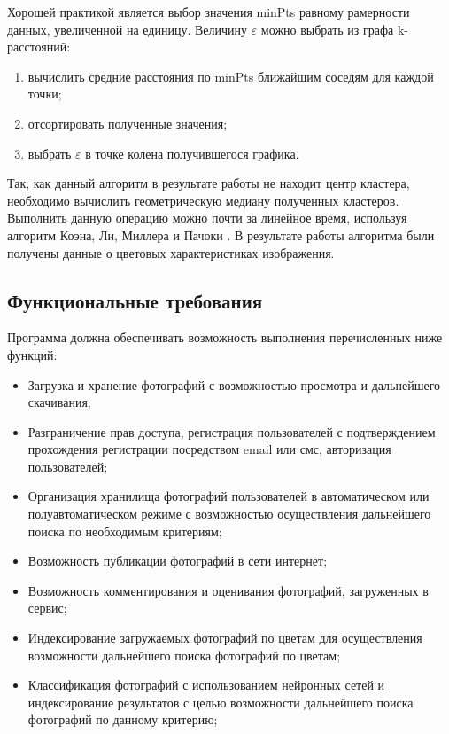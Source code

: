 Хорошей практикой является выбор значения minPts равному рамерности данных, увеличенной на единицу.
Величину \(\mathcal{\varepsilon}\) можно выбрать из графа k-расстояний\cite{k-graph}:
\begin{enumerate}
    \item вычислить средние расстояния по minPts ближайшим соседям для каждой точки;
    \item отсортировать полученные значения;
    \item выбрать \(\mathcal{\varepsilon}\) в точке колена получившегося графика.
\end{enumerate}

Так, как данный алгоритм в результате работы не находит центр кластера, необходимо вычислить геометрическую медиану полученных кластеров.
Выполнить данную операцию можно почти за линейное время, используя алгоритм Коэна, Ли, Миллера и Пачоки \cite{median-linear}.
В результате работы алгоритма были получены данные о цветовых характеристиках изображения.

\subsection{Функциональные требования}

Программа должна обеспечивать возможность выполнения перечисленных ниже функций:
\begin{itemize}
  \item Загрузка и хранение фотографий с возможностью просмотра и дальнейшего скачивания;
  \item Разграничение прав доступа, регистрация пользователей с подтверждением прохождения регистрации посредством email или смс, авторизация пользователей;
  \item Организация хранилища фотографий пользователей в автоматическом или полуавтоматическом режиме с возможностью осуществления дальнейшего поиска по необходимым критериям;
  \item Возможность публикации фотографий в сети интернет;
  \item Возможность комментирования и оценивания фотографий, загруженных в сервис;
  \item Индексирование загружаемых фотографий по цветам для осуществления возможности дальнейшего поиска фотографий по цветам;
  \item Классификация фотографий с использованием нейронных сетей и индексирование результатов с целью возможности дальнейшего поиска фотографий по данному критерию;
\end{itemize}

